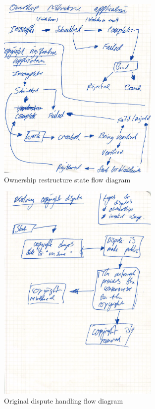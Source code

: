 \begin{figure}[H]
\caption{Ownership restructure state flow diagram}
\centering
\includegraphics[width=0.7\textwidth,height=\textheight,keepaspectratio]{images/appendix/design/docs/restruct}
\end{figure}

\begin{figure}[H]
\caption{Original dispute handling flow diagram}
\centering
\includegraphics[width=0.7\textwidth,height=\textheight,keepaspectratio]{images/appendix/design/docs/dispute}
\end{figure}

